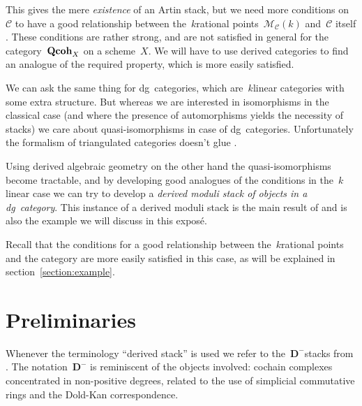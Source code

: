 \begin{refsection}
\begin{example}
  This gives the mere \emph{existence} of an Artin stack, but we need more conditions on~$\mathcal{C}$ to have a good relationship between the~$k$\dash rational points~$\mathcal{M}_{\mathcal{C}}(k)$ and~$\mathcal{C}$ itself \cite[remark 1.2]{toen-vaquie}. These conditions are rather strong, and are not satisfied in general for the category~$\mathbf{Qcoh}_X$ on a scheme~$X$. We will have to use derived categories to find an analogue of the required property, which is more easily satisfied.
\end{example}

\begin{remark}
  We can ask the same thing for dg~categories, which are~$k$\dash linear categories with some extra structure. But whereas we are interested in isomorphisms in the classical case (and where the presence of automorphisms yields the necessity of stacks) we care about quasi-isomorphisms in case of dg~categories. Unfortunately the formalism of triangulated categories doesn't glue \cite{lnm2008}.

  Using derived algebraic geometry on the other hand the quasi-isomorphisms become tractable, and by developing good analogues of the conditions in the~$k$\dash linear case we can try to develop a \emph{derived moduli stack of objects in a dg~category}. This instance of a derived moduli stack is the main result of \cite{toen-vaquie} and is also the example we will discuss in this expos\'e.
  
  Recall that the conditions for a good relationship between the~$k$\dash rational points and the category are more easily satisfied in this case, as will be explained in section~\ref{section:example}.
\end{remark}

\begin{example}
  
\end{example}

\section{Preliminaries}
\label{section:preliminaries}
Whenever the terminology ``derived stack'' is used we refer to the~$\mathbf{D}^-$\dash stacks from \cite{hagII}. The notation~$\mathbf{D}^-$ is reminiscent of the objects involved: cochain complexes concentrated in non-positive degrees, related to the use of simplicial commutative rings and the Dold-Kan correspondence.


\end{refsection}

